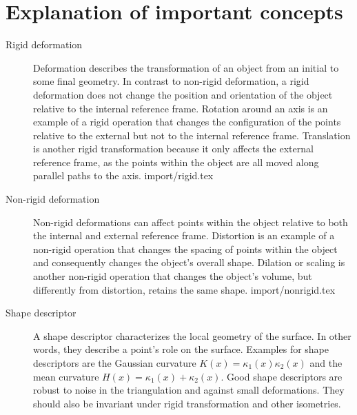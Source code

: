 \documentclass[class=article, crop=false]{standalone}
\begin{document}
\section{Explanation of important concepts}
\label{sec:app_imp_concepts}
\begin{description}
    \item[Rigid deformation] Deformation describes the transformation of an object from an initial to some final geometry. In contrast to non-rigid deformation, a rigid deformation does not change the position and orientation of the object relative to the internal reference frame. Rotation around an axis is an example of a rigid operation that changes the configuration of the points relative to the external but not to the internal reference frame. Translation is another rigid transformation because it only affects the external reference frame, as the points within the object are all moved along parallel paths to the axis.
    {import/rigid.tex}
    
    \item[Non-rigid deformation] Non-rigid deformations can affect points within the object relative to both the internal and external reference frame. Distortion is an example of a non-rigid operation that changes the spacing of points within the object and consequently changes the object's overall shape. Dilation or scaling is another non-rigid operation that changes the object's volume, but differently from distortion, retains the same shape.
    {import/nonrigid.tex}
    
    
    \item[Shape descriptor] A shape descriptor characterizes the local geometry of the surface. In other words, they describe a point's role on the surface. Examples for shape descriptors are the Gaussian curvature $K(x) = \kappa_1(x)\kappa_2(x)$ and the mean curvature $H(x) = \kappa_1(x)+\kappa_2(x)$. Good shape descriptors are robust to noise in the triangulation and against small deformations. They should also be invariant under rigid transformation and other isometries. \cite{stanfod_iso}
    

\end{description}
\end{document}
